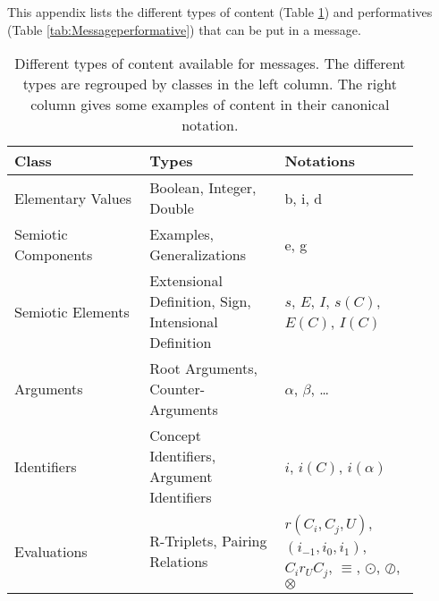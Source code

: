 This appendix lists the different types of content (Table \ref{tab:MessageContent}) and performatives (Table \ref{tab:Messageperformative}) that can be put in a message. 


\begin{table}
    \centering
    \begin{tabular}[t]{| >{\raggedright\arraybackslash}m{0.3\linewidth} | >{\raggedright\arraybackslash}m{0.3\linewidth}  | >{\raggedright\arraybackslash}m{0.3\linewidth} | } 
         \hline
         Class & Types & Notations \\
         \hline
         \hline
         Elementary Values & Boolean, Integer, Double & b, i, d \\
         \hline
         Semiotic Components & Examples, Generalizations & e, g \\
         \hline
         Semiotic Elements & Extensional Definition, Sign, Intensional Definition & $s$, $E$, $I$, $s(C)$, $E(C)$, $I(C)$ \\ 
         \hline
         Arguments & Root Arguments, Counter-Arguments & $\alpha$, $\beta$, \ldots \\ 
         \hline
         Identifiers & Concept Identifiers, Argument Identifiers & $i$, $i(C)$, $i(\alpha)$ \\
         \hline
         Evaluations & R-Triplets, Pairing Relations & $r(C_{i}, C_{j}, U)$, $(i_{-1}, i_{0}, i_{1})$, $C_{i} r_{U} C_{j}$, $\equiv$, $\odot$, $\oslash$, $\otimes$ \\
         \hline
    \end{tabular}
    \caption{Different types of content available for messages. The different types are regrouped by classes in the left column. The right column gives some examples of content in their canonical notation.}
    \label{tab:MessageContent}
\end{table}

